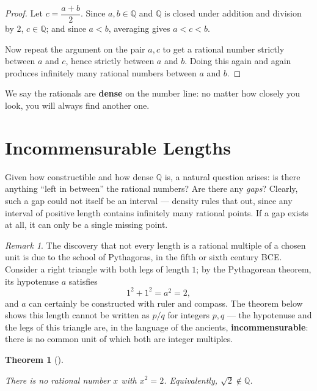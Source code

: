 \documentclass[
  letterpaper,
  DIV=11,
  numbers=noendperiod]{scrreprt}
\theoremstyle{plain}
\theoremstyle{plain}
\theoremstyle{definition}
\theoremstyle{definition}
\theoremstyle{definition}
\theoremstyle{plain}
\newtheorem{theorem}{Theorem}[chapter]
\theoremstyle{plain}
\theoremstyle{remark}
\newtheorem{refremark}{Remark}[chapter]
\begin{document}
\begin{proof}
Let \(c=\dfrac{a+b}{2}\). Since \(a,b\in\mathbb{Q}\) and \(\mathbb{Q}\)
is closed under addition and division by \(2\), \(c\in\mathbb{Q}\); and
since \(a<b\), averaging gives \(a<c<b\).

Now repeat the argument on the pair \(a,c\) to get a rational number
strictly between \(a\) and \(c\), hence strictly between \(a\) and
\(b\). Doing this again and again produces infinitely many rational
numbers between \(a\) and \(b\).
\end{proof}

We say the rationals are \textbf{dense} on the number line: no matter
how closely you look, you will always find another one.

\section{Incommensurable Lengths}\label{sec-incommensurable}

Given how constructible and how dense \(\mathbb{Q}\) is, a natural
question arises: is there anything ``left in between'' the rational
numbers? Are there any \emph{gaps}? Clearly, such a gap could not itself
be an interval --- density rules that out, since any interval of
positive length contains infinitely many rational points. If a gap
exists at all, it can only be a single missing point.

\begin{refremark}
The discovery that not every length is a rational multiple of a chosen
unit is due to the school of Pythagoras, in the fifth or sixth century
BCE. Consider a right triangle with both legs of length \(1\); by the
Pythagorean theorem, its hypotenuse \(a\) satisfies \[
1^2+1^2 = a^2 = 2,
\] and \(a\) can certainly be constructed with ruler and compass. The
theorem below shows this length cannot be written as \(p/q\) for
integers \(p,q\) --- the hypotenuse and the legs of this triangle are,
in the language of the ancients, \textbf{incommensurable}: there is no
common unit of which both are integer multiples.

\label{rem-pythagoras}

\end{refremark}

\begin{theorem}[]\protect\hypertarget{thm-sqrt2-irrational}{}\label{thm-sqrt2-irrational}

\hfill\break
There is no rational number \(x\) with \(x^2=2\). Equivalently,
\(\sqrt2 \notin \mathbb{Q}\).

\end{theorem}
\end{document}
